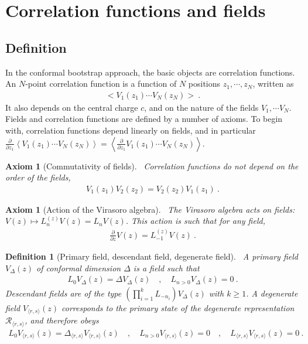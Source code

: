 \documentclass[12pt, a4paper]{article}
\theoremstyle{break}
\newtheorem{hyp}[exo]{Axiom}
\newtheorem{defn}[exo]{Definition}
\begin{document}
\section{Correlation functions and fields}\label{sec:cft}

\subsection{Definition}

In the conformal bootstrap approach, the basic objects are correlation functions. An $N$-point correlation function is a function of $N$ positions $z_1,\cdots,z_N$, written as 
\begin{align}
  \Big< V_1(z_1) \cdots V_N(z_N) \Big>\ .
 \end{align}
It also depends on the central charge $c$, and on the nature of the fields $V_1,\cdots V_N$. Fields and correlation functions are defined by a number of axioms. To begin with, correlation functions depend linearly on fields, and in particular $\frac{\partial}{\partial z_1} \left< V_1(z_1) \cdots V_N(z_N) \right> = \left< \frac{\partial}{\partial z_1}V_1(z_1) \cdots V_N(z_N) \right>$. 

\begin{hyp}[Commutativity of fields]
 ~\label{hyp:ass}
 Correlation functions do not depend on the order of the fields,
 \begin{align}
  V_1(z_1) V_2(z_2) = V_2(z_2)V_1(z_1)\ .
 \end{align}
\end{hyp}

\begin{hyp}[Action of the Virasoro algebra]
~\label{hyp:vaf}
 The Virasoro algebra acts on fields: $V(z) \mapsto L_n^{(z)}V(z)=L_n V(z)$. This action is such that for any field,
 \begin{align}
  \frac{\partial}{\partial z} V(z) = L_{-1}^{(z)} V(z)  \ .
  \label{pvlv}
 \end{align}
\end{hyp}

\begin{defn}[Primary field, descendant field, degenerate field]
~\label{def:pfdf}
A primary field $V_\Delta(z)$ of conformal dimension $\Delta$ is a field such that 
\begin{align}
 L_0 V_\Delta(z) = \Delta V_\Delta(z) \quad , \quad  L_{n> 0} V_\Delta(z) = 0 \ .
\end{align}
Descendant fields are of the type $\left(\prod_{i=1}^k L_{-n_i}\right) V_\Delta(z)$ with $k\geq 1$.
A degenerate field $V_{\langle r,s\rangle}(z)$ corresponds to the primary state of the degenerate representation $\mathcal{R}_{\langle r,s\rangle}$, and therefore obeys 
\begin{align}
L_0 V_{\langle r,s\rangle}(z) = \Delta_{\langle r,s\rangle} V_{\langle r,s\rangle}(z) \quad , \quad  L_{n> 0} V_{\langle r,s\rangle}(z) = 0 \quad , \quad L_{\langle r, s\rangle} V_{\langle r,s\rangle}(z) = 0\ .
\end{align}
\end{defn}
\end{document}
